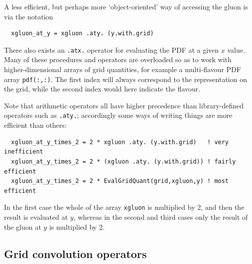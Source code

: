 \documentclass[12pt]{article}
\newcommand{\ttt}[1]{\texttt{#1}}
\begin{document}
A less efficient, but perhaps more `object-oriented' way of accessing
the gluon is via the notation 
\begin{lstlisting}
  xgluon_at_y = xgluon .aty. (y.with.grid)
\end{lstlisting}
There also exists an \ttt{.atx.} operator for evaluating the PDF at a
given $x$ value.  Many of these procedures and operators are
overloaded so as to work with higher-dimensional arrays of grid
quantities, for example a multi-flavour
PDF array \texttt{pdf(:,:)}. The first index will
always correspond to the representation on the grid, while the second
index would here indicate the flavour.

Note that arithmetic operators all have higher precedence than
library-defined operators such as \texttt{.aty.}; accordingly some
ways of writing things are more efficient than others:
\begin{lstlisting}
  xgluon_at_y_times_2 = 2 * xgluon .aty. (y.with.grid)   ! very inefficient
  xgluon_at_y_times_2 = 2 * (xgluon .aty. (y.with.grid)) ! fairly efficient
  xgluon_at_y_times_2 = 2 * EvalGridQuant(grid,xgluon,y) ! most efficient
\end{lstlisting}
In the first case the whole of the array \texttt{xgluon} is multiplied
by 2, and then the result is evaluated at $y$, whereas in the second
and third
cases only the result of the gluon at $y$ is multiplied by 2.

\subsection{Grid convolution operators}
\label{sec:conv}
\end{document}
